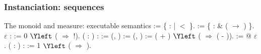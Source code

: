 \begin{frame}
  \frametitle{Instanciation: sequences}
  \begin{block}{The monoid and measure: executable semantics}
    \scriptsize{   := \{  :  |  $<$  \}.\coqdoceol
      := \{  :  \& (  \ensuremath{\rightarrow} ) \}.\coqdoceol
     $\varepsilon$ :  := 0 $\Yleft$ ( \coqdocid{\_} \ensuremath{\Rightarrow} !).\coqdoceol
      (  : ) :  := \coqdoceol
    \coqdocindent{1.00em}
     (, ) :=  
     (, ) :=  \coqdoceol
    \coqdocindent{2.00em}
    ( + ) $\Yleft$ \coqdoceol
    \coqdocindent{3.00em}
    (  \ensuremath{\Rightarrow} 
       
       
    ( - )).\coqdoceol
      := @  $\varepsilon$  \coqdocid{\_} \coqdocid{\_} \coqdocid{\_}.\coqdoceol
      ( : ) :  := 1 $\Yleft$ ( \coqdocid{\_} \ensuremath{\Rightarrow} ).\coqdoceol
  }
  \end{block}


\end{frame}
